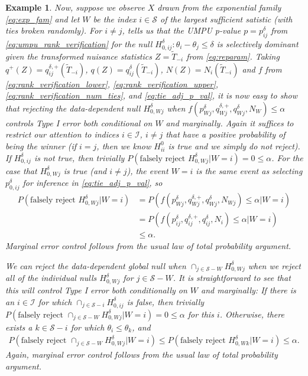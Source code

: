 \documentclass{article}
\newtheorem{example}{Example}
\begin{document}
\begin{example}
    Now, suppose we observe $X$ drawn from the exponential family \eqref{eq:exp_fam} and let $W$ be the index $i \in \mathcal{S}$ of the largest sufficient satistic (with ties broken randomly). For $i \neq j$,  tells us that the UMPU p-value $p = p_{ij}^{\delta}$ from \eqref{eq:umpu_rank_verification} for the null $H_{0, ij}^{\delta}: \theta_i - \theta_j \leq \delta$ is selectively dominant given the transformed nuisance statistics $Z = \widetilde{T}_{-i}$ from \eqref{eq:reparam}. Taking $q^+(Z) = q^{\delta, +}_{ij}( \widetilde{T}_{-i})$, $q(Z) = q^{\delta}_{ij}( \widetilde{T}_{-i})$, $N(Z) = N_{i}(\widetilde{T}_{-i})$ and $f$ from  \eqref{eq:rank_verification_lower}, \eqref{eq:rank_verification_upper}, \eqref{eq:rank_verification_num_ties}, and \eqref{eq:tie_adj_p_val}, it is now easy to show that rejecting the data-dependent null $H^{\delta}_{0, Wj}$ when $f(p^{\delta}_{Wj}, q^{\delta, +}_{Wj}, q^{\delta}_{Wj}, N_{W}) \leq \alpha$ controls Type I error both conditional on $W$ and marginally. Again it suffices to restrict our attention to indices $i \in \mathcal{I}$, $i \neq j$ that have a positive probability of being the winner (if $i=j$, then we know $H^0_{ii}$ is true and we simply do not reject). If $H^{\delta}_{0, ij}$ is not true, then trivially $P(\text{falsely reject } H^{\delta}_{0, Wj}| W= i) = 0 \leq \alpha$. For the case that $H^{\delta}_{0, Wj}$ is true (and $i \neq j$), the event $W=i$ is the same event as selecting $p_{0, ij}^{\delta}$ for inference in \eqref{eq:tie_adj_p_val}, so 
    \begin{align*}
        P(\text{falsely reject } H^{\delta}_{0, Wj}| W= i) &= P(f(p^{\delta}_{Wj}, q^{\delta, +}_{Wj}, q^{\delta}_{Wj}, N_{Wj}) \leq \alpha | W= i) \\
        &= P(f(p^{\delta}_{ij}, q^{\delta, +}_{ij}, q^{\delta}_{ij}, N_i) \leq \alpha | W = i) \\
        &\leq \alpha. 
    \end{align*}
    Marginal error control follows from the usual law of total probability argument.

    We can reject the data-dependent global null when  $\cap_{j \in \mathcal{S} - W} H^{\delta}_{0, Wj}$ when we reject all of the individual nulls $H^{\delta}_{0, Wj}$ for $j \in \mathcal{S} - W$. It is straightforward to see that this will control Type I error both conditionally on $W$ and marginally: If there is an $i \in \mathcal{I}$ for which $\cap_{j \in \mathcal{S} - i} H^{\delta}_{0, ij}$ is false, then trivially $P(\text{falsely reject } \cap_{j \in \mathcal{S} - W} H^{\delta}_{0, Wj}| W= i) = 0 \leq \alpha$ for this $i$. Otherwise, there exists a $k \in \mathcal{S} - i$ for which $\theta_i \leq \theta_k$, and 
    \begin{align*}
        P(\text{falsely reject } \cap_{j \in \mathcal{S} - W} H^{\delta}_{0, Wj}| W= i) \leq P(\text{falsely reject } H^{\delta}_{0, Wk}| W= i) \leq \alpha.\
    \end{align*} 
    Again, marginal error control follows from the usual law of total probability argument.
\end{example}
\end{document}
